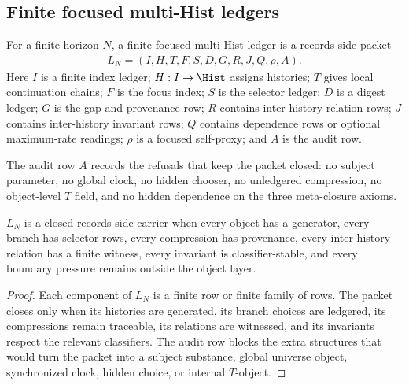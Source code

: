 \subsection{Finite focused multi-Hist ledgers}
\label{subsec:philosophy-focused-multi-hist-ledgers}

\begin{definition}
\label{def:philosophy-focused-multi-hist-ledger}
For a finite horizon \(N\), a finite focused multi-Hist ledger is a
records-side packet
$$
\begin{gathered}
L_N=(I,H,T,F,S,D,G,R,J,Q,\rho,A).
\end{gathered}
$$
Here \(I\) is a finite index ledger; \(H:I\to\Hist\) assigns histories;
\(T\) gives local continuation chains; \(F\) is the focus index;
\(S\) is the selector ledger; \(D\) is a digest ledger; \(G\) is the
gap and provenance row; \(R\) contains inter-history relation rows;
\(J\) contains inter-history invariant rows; \(Q\) contains dependence
rows or optional maximum-rate readings; \(\rho\) is a focused
self-proxy; and \(A\) is the audit row.
\end{definition}

\begin{definition}
\label{def:philosophy-focused-ledger-audit-row}
The audit row \(A\) records the refusals that keep the packet closed:
no subject parameter, no global clock, no hidden chooser, no
unledgered compression, no object-level \(T\) field, and no hidden
dependence on the three meta-closure axioms.
\end{definition}

\begin{theorem}
\label{thm:philosophy-closed-records-side-carrier}
\(L_N\) is a closed records-side carrier when every object has a
generator, every branch has selector rows, every compression has
provenance, every inter-history relation has a finite witness, every
invariant is classifier-stable, and every boundary pressure remains
outside the object layer.
\end{theorem}
\begin{proof}
Each component of \(L_N\) is a finite row or finite family of rows. The
packet closes only when its histories are generated, its branch choices
are ledgered, its compressions remain traceable, its relations are
witnessed, and its invariants respect the relevant classifiers. The
audit row blocks the extra structures that would turn the packet into a
subject substance, global universe object, synchronized clock, hidden
choice, or internal \(T\)-object.
\end{proof}

